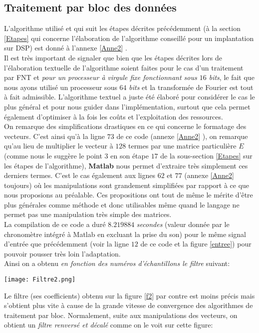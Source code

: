 \subsection{Traitement par bloc des données}\label{Bloc}
L'algorithme utilisé et qui suit les étapes décrites précédemment (à la section \ref{Etapes} qui concerne l'élaboration de l'algorithme conseillé pour un implantation sur DSP) est donné à l'annexe \ref{Anne2} .\\
Il est très important de signaler que bien que les étapes décrites lors de l'élaboration textuelle de l'algorithme soient faites pour le cas d'un traitement par FNT et \emph{pour un processeur à virgule fixe fonctionnant sous $ 16 $ bits}, le fait que nous ayons utilisé un processeur sous $ 64 $ \emph{bits} et la transformée de Fourier est tout à fait admissible. L'algorithme textuel a juste été élaboré pour considérer le cas le plus général et pour nous guider dans l'implémentation, surtout que cela permet également d'optimiser à la fois les coûts et l'exploitation des ressources.\\ 
On remarque des simplifications drastiques en ce qui concerne le formatage des vecteurs. C'est ainsi qu'à la ligne $ 73 $ de ce code (annexe \ref{Anne2} ), on remarque qu'au lieu de multiplier le vecteur à $ 128 $ termes par une matrice particulière $ E $ (comme nous le suggère le point $ 3 $ en son étape $ 17 $ de la sous-section \ref{Etapes} sur les étapes de l'algorithme), \textbf{Matlab} nous permet d'extraire très simplement ces derniers termes. C'est le cas également aux lignes $ 62 $ et $ 77 $ (annexe \ref{Anne2} toujours)  où les manipulations sont grandement simplifiées par rapport à ce que nous proposions au préalable. Ces propositions ont tout de même le mérite d'être plus générales comme méthode et donc utilisables même quand le langage ne permet pas une manipulation très simple des matrices.\\
La compilation de ce code a duré $ 8.219884 $ \emph{secondes} (valeur donnée par le chronomètre intégré à Matlab en excluant la prise du son) pour le même signal d'entrée que précédemment (voir la ligne $ 12 $ de ce code et la figure \ref{entree}) pour pouvoir pousser très loin l'adaptation.\\
Ainsi on a obtenu \textit{en fonction des numéros d'échantillons le filtre} suivant:
\begin{center}
\texttt{[image: Filtre2.png]}
\label{f2}
\end{center}
Le filtre (ses coefficients) obtenu sur la figure \ref{f2} par contre est moins précis mais s'obtient plus vite à cause de la grande vitesse de convergence des algorithmes de traitement par bloc. Normalement, suite aux manipulations des vecteurs, on obtient un \emph{filtre renversé et décalé} comme on le voit sur cette figure:
